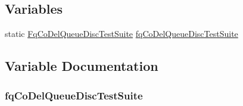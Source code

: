 \subsection*{Variables}
\begin{DoxyCompactItemize}
\item 
static \hyperlink{classFqCoDelQueueDiscTestSuite}{Fq\+Co\+Del\+Queue\+Disc\+Test\+Suite} \hyperlink{fq-codel-queue-disc-test-suite_8cc_a989125a2edd5578667d3e48dc877991b}{fq\+Co\+Del\+Queue\+Disc\+Test\+Suite}
\end{DoxyCompactItemize}


\subsection{Variable Documentation}
\subsubsection[{\texorpdfstring{fq\+Co\+Del\+Queue\+Disc\+Test\+Suite}{fqCoDelQueueDiscTestSuite}}]{ fq\+Co\+Del\+Queue\+Disc\+Test\+Suite\hspace{0.3cm}{\ttfamily [static]}}\hypertarget{fq-codel-queue-disc-test-suite_8cc_a989125a2edd5578667d3e48dc877991b}{}\label{fq-codel-queue-disc-test-suite_8cc_a989125a2edd5578667d3e48dc877991b}

